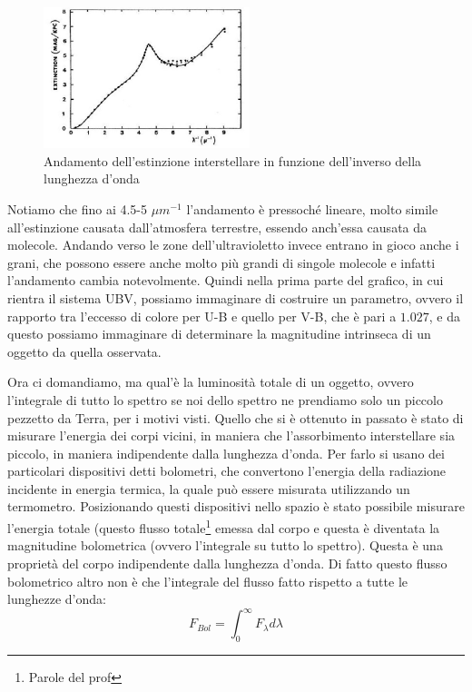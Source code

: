 \documentclass[a4paper,11pt]{article}
\begin{document}
    \newpage
    
    \begin{figure}[h!]
        \centering
        \includegraphics[width=6cm]{estinzione interstellare.jpg}
        \caption{Andamento dell'estinzione interstellare in funzione dell'inverso della lunghezza d'onda}
        \label{fig:esti inter}
    \end{figure}
    
    Notiamo che fino ai 4.5-5 $\mu m^{-1}$ l'andamento è pressoché lineare, molto simile all'estinzione causata dall'atmosfera terrestre, essendo anch'essa causata da molecole. Andando verso le zone dell'ultravioletto invece entrano in gioco anche i grani, che possono essere anche molto più grandi di singole molecole e infatti l'andamento cambia notevolmente. Quindi nella prima parte del grafico, in cui rientra il sistema UBV, possiamo immaginare di costruire un parametro, ovvero il rapporto tra l'eccesso di colore per U-B e quello per V-B, che è pari a $1.027$, e da questo possiamo immaginare di determinare la magnitudine intrinseca di un oggetto da quella osservata.
    
    Ora ci domandiamo, ma qual'è la luminosità totale di un oggetto, ovvero l'integrale di tutto lo spettro se noi dello spettro ne prendiamo solo un piccolo pezzetto da Terra, per i motivi visti. Quello che si è ottenuto in passato è stato di misurare l'energia dei corpi vicini, in maniera che l'assorbimento interstellare sia piccolo, in maniera indipendente dalla lunghezza d'onda. Per farlo si usano dei particolari dispositivi detti bolometri, che convertono l'energia della radiazione incidente in energia termica, la quale può essere misurata utilizzando un termometro. Posizionando questi dispositivi nello spazio è stato possibile misurare l'energia totale (questo flusso totale\footnote{Parole del prof} emessa dal corpo e questa è diventata la magnitudine bolometrica (ovvero l'integrale su tutto lo spettro). Questa è una proprietà del corpo indipendente dalla lunghezza d'onda. Di fatto questo flusso bolometrico altro non è che l'integrale del flusso fatto rispetto a tutte le lunghezze d'onda:
    $$
        F_{Bol} = \int_0^{\infty} F_{\lambda} d\lambda 
    $$
    
\end{document}
